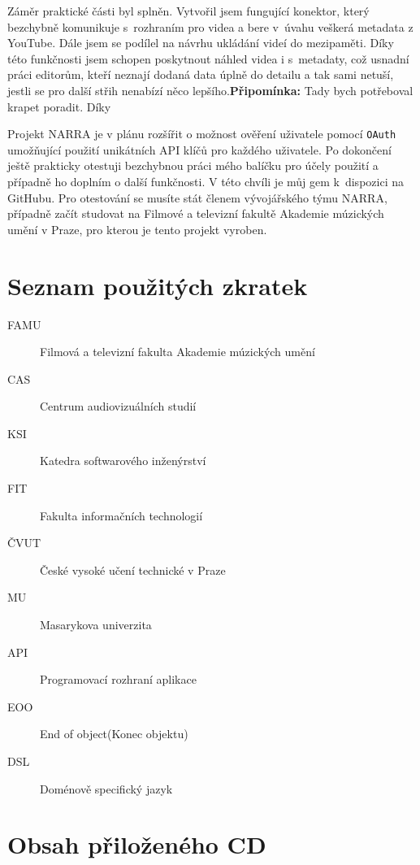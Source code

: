 \documentclass[thesis=B,czech]{FITthesis}[2012/06/26]
\newcommand{\note}[1]{{\color{red}\textbf{Připomínka:} #1}}
\begin{document}
\begin{conclusion}
	\par Záměr praktické části byl splněn. Vytvořil jsem fungující konektor, který bezchybně komunikuje s~rozhraním pro videa a bere v~úvahu veškerá metadata z YouTube. Dále jsem se podílel na návrhu ukládání videí do mezipaměti. Díky této funkčnosti jsem schopen poskytnout náhled videa i s~metadaty, což usnadní práci editorům, kteří neznají dodaná data úplně do detailu a tak sami netuší, jestli se pro další střih nenabízí něco lepšího.\note{Tady bych potřeboval krapet poradit. Díky}
	\par Projekt NARRA je v plánu rozšířit o možnost ověření uživatele pomocí \texttt{OAuth} umožňující použití unikátních API klíčů pro každého uživatele. Po dokončení ještě prakticky otestuji bezchybnou práci mého balíčku pro účely použití a případně ho doplním o další funkčnosti. V této chvíli je můj gem k~dispozici na GitHubu\cite{myself}. Pro otestování se musíte stát členem vývojářského týmu NARRA, případně začít studovat na Filmové a televizní fakultě Akademie múzických umění v Praze, pro kterou je tento projekt vyroben.
\end{conclusion}




\appendix

\chapter{Seznam použitých zkratek}
\begin{description}
	\item[FAMU] Filmová a televizní fakulta Akademie múzických umění
	\item[CAS] Centrum audiovizuálních studií
	\item[KSI] Katedra softwarového inženýrství
	\item[FIT] Fakulta informačních technologií
	\item[ČVUT] České vysoké učení technické v Praze
	\item[MU] Masarykova univerzita
	\item[API] Programovací rozhraní aplikace
	\item[EOO] End of object(Konec objektu)
	\item[DSL] Doménově specifický jazyk
\end{description}


\chapter{Obsah přiloženého CD}

\begin{figure}
\end{figure}
\end{document}
